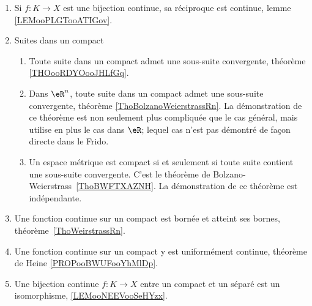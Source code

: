 \begin{description}
\begin{enumerate}
			\item
			      Si \( f\colon K\to X\) est une bijection continue, sa réciproque est continue, lemme \ref{LEMooPLGTooATIGov}.
			\item
			      Suites dans un compact
			      \begin{enumerate}
				      \item
				            Toute suite dans un compact admet une sous-suite convergente, théorème \ref{THOooRDYOooJHLfGq}.
				      \item
				            Dans \( \eR^n\), toute suite dans un compact admet une sous-suite convergente, théorème \ref{ThoBolzanoWeierstrassRn}. La démonstration de ce théorème est non seulement plus compliquée que le cas général, mais utilise en plus le cas dans \( \eR\); lequel cas n'est pas démontré de façon directe dans le Frido.
				      \item
				            Un espace métrique est compact si et seulement si toute suite contient une sous-suite convergente. C'est le théorème de Bolzano-Weierstrass~\ref{ThoBWFTXAZNH}. La démonstration de ce théorème est indépendante.
			      \end{enumerate}
			\item
			      Une fonction continue sur un compact est bornée et atteint ses bornes, théorème~\ref{ThoWeirstrassRn}.
			\item
			      Une fonction continue sur un compact y est uniformément continue, théorème de Heine \ref{PROPooBWUFooYhMlDp}.
			\item
			      Une bijection continue \( f\colon K\to X\) entre un compact et un séparé est un isomorphisme, \ref{LEMooNEEVooSeHYzx}.
		\end{enumerate}


\end{description}
